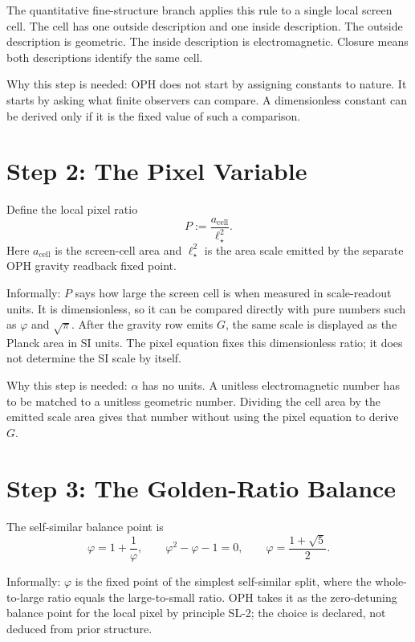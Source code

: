 \documentclass[11pt]{article}
\theoremstyle{remark}
\begin{document}
The quantitative fine-structure branch applies this rule to a single local screen cell. The cell has one outside description and one inside description. The outside description is geometric. The inside description is electromagnetic. Closure means both descriptions identify the same cell.

Why this step is needed: OPH does not start by assigning constants to nature. It starts by asking what finite observers can compare. A dimensionless constant can be derived only if it is the fixed value of such a comparison.

\section{Step 2: The Pixel Variable}

Define the local pixel ratio
\begin{equation}
P:=\frac{a_{\mathrm{cell}}}{\ell_\star^2}.
\label{eq:Pdef}
\end{equation}
Here \(a_{\mathrm{cell}}\) is the screen-cell area and \(\ell_\star^2\) is the area scale emitted
by the separate OPH gravity readback fixed point.

Informally: \(P\) says how large the screen cell is when measured in scale-readout units. It is dimensionless, so it can be compared directly with pure numbers such as \(\varphi\) and \(\sqrt\pi\). After the gravity row emits \(G\), the same scale is displayed as the Planck area in SI units. The pixel equation fixes this dimensionless ratio; it does not determine the SI scale by itself.

Why this step is needed: \(\alpha\) has no units. A unitless electromagnetic number has to be matched to a unitless geometric number. Dividing the cell area by the emitted scale area gives that number without using the pixel equation to derive \(G\).

\section{Step 3: The Golden-Ratio Balance}

The self-similar balance point is
\begin{equation}
\varphi=1+\frac{1}{\varphi},
\qquad
\varphi^2-\varphi-1=0,
\qquad
\varphi=\frac{1+\sqrt5}{2}.
\label{eq:phi}
\end{equation}

Informally: \(\varphi\) is the fixed point of the simplest self-similar split, where the whole-to-large ratio equals the large-to-small ratio. OPH takes it as the zero-detuning balance point for the local pixel by principle SL-2; the choice is declared, not deduced from prior structure.
\end{document}
